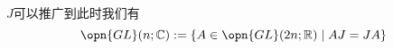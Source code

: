 $J$可以推广到此时我们有
$$
\opn{GL}(n; \mathbb{C}): = \{A \in \opn{GL}(2 n; \mathbb{R}) \mid A J = J A \}
$$





